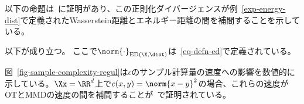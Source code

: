 以下の命題は~\citep{ramdas2017wasserstein}に証明があり、この正則化ダイバージェンスが例~\ref{exp-energy-dist}で定義されたWasserstein距離とエネルギー距離の間を補間することを示している。

\begin{prop}
	以下が成り立つ。
	ここで$\norm{\cdot}_{\text{ED}(\X,\dist)}$は~\eqref{eq-defn-ed}で定義されている。
\end{prop}

図~\ref{fig-sample-complexity-regul}は$\epsilon$のサンプル計算量の速度への影響を数値的に示している。$\Xx=\RR^d$上で$c(x,y)=\norm{x-y}^2$の場合、これらの速度がOTとMMDの速度の間を補間することが~\cite{genevay2018sample}で証明されている。




